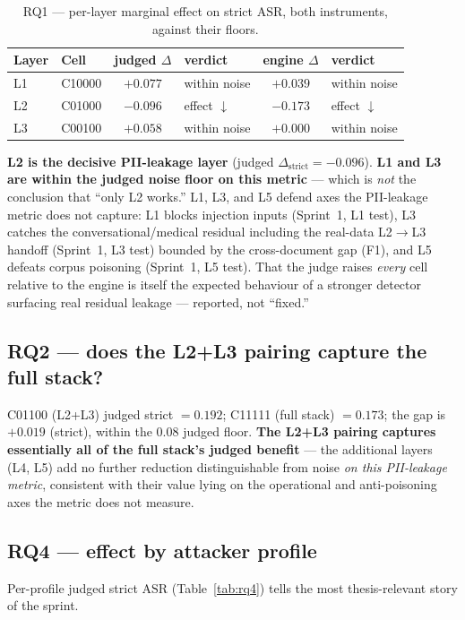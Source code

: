 \documentclass[11pt,a4paper]{article}
\newcommand{\asr}{\textrm{ASR}}
\begin{document}
\begin{table}[h]
\centering
\caption{RQ1 --- per-layer marginal effect on strict $\asr$, both instruments, against their floors.}
\label{tab:rq1}
\begin{tabular}{l l c l c l}
\toprule
\textbf{Layer} & \textbf{Cell} & \textbf{judged $\Delta$} & \textbf{verdict} & \textbf{engine $\Delta$} & \textbf{verdict} \\
\midrule
L1 & C10000 & $+0.077$ & within noise & $+0.039$ & within noise \\
L2 & C01000 & $-0.096$ & effect $\downarrow$ & $-0.173$ & effect $\downarrow$ \\
L3 & C00100 & $+0.058$ & within noise & $+0.000$ & within noise \\
\bottomrule
\end{tabular}
\end{table}

\textbf{L2 is the decisive PII-leakage layer} (judged $\Delta_{\text{strict}} = -0.096$). \textbf{L1 and L3 are within the judged noise floor on this metric} --- which is \emph{not} the conclusion that ``only L2 works.'' L1, L3, and L5 defend axes the PII-leakage metric does not capture: L1 blocks injection inputs (Sprint~1, L1 test), L3 catches the conversational/medical residual including the real-data L2$\to$L3 handoff (Sprint~1, L3 test) bounded by the cross-document gap (F1), and L5 defeats corpus poisoning (Sprint~1, L5 test). That the judge raises \emph{every} cell relative to the engine is itself the expected behaviour of a stronger detector surfacing real residual leakage --- reported, not ``fixed.''

\subsection{RQ2 --- does the L2+L3 pairing capture the full stack?}
C01100 (L2+L3) judged strict $= 0.192$; C11111 (full stack) $= 0.173$; the gap is $+0.019$ (strict), within the $0.08$ judged floor. \textbf{The L2+L3 pairing captures essentially all of the full stack's judged benefit} --- the additional layers (L4, L5) add no further reduction distinguishable from noise \emph{on this PII-leakage metric}, consistent with their value lying on the operational and anti-poisoning axes the metric does not measure.

\subsection{RQ4 --- effect by attacker profile}
Per-profile judged strict $\asr$ (Table~\ref{tab:rq4}) tells the most thesis-relevant story of the sprint.
\end{document}
